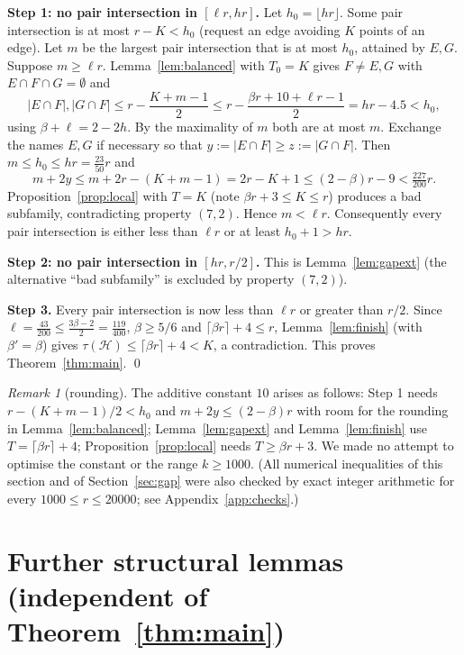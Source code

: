 \documentclass[11pt]{amsart}
\theoremstyle{definition}
\theoremstyle{remark}
\newtheorem{remark}[theorem]{Remark}
\newcommand{\cH}{\mathcal H}
\newcommand{\ceil}[1]{\lceil #1\rceil}
\newcommand{\floor}[1]{\lfloor #1\rfloor}
\begin{document}
\medskip\noindent\textbf{Step 1: no pair intersection in $[\ell r,hr]$.} Let $h_0=\floor{hr}$. Some pair intersection is at most $r-K<h_0$ (request an edge avoiding $K$ points of an edge). Let $m$ be the largest pair intersection that is at most $h_0$, attained by $E,G$. Suppose $m\ge\ell r$. Lemma~\ref{lem:balanced} with $T_0=K$ gives $F\ne E,G$ with $E\cap F\cap G=\emptyset$ and
\[
|E\cap F|,|G\cap F|\le r-\frac{K+m-1}{2}\le r-\frac{\beta r+10+\ell r-1}{2}=hr-4.5<h_0,
\]
using $\beta+\ell=2-2h$. By the maximality of $m$ both are at most $m$. Exchange the names $E,G$ if necessary so that $y:=|E\cap F|\ge z:=|G\cap F|$. Then $m\le h_0\le hr=\tfrac{23}{50}r$ and
\[
m+2y\le m+2r-(K+m-1)=2r-K+1\le(2-\beta)r-9<\tfrac{227}{200}r .
\]
Proposition~\ref{prop:local} with $T=K$ (note $\beta r+3\le K\le r$) produces a bad subfamily, contradicting property $(7,2)$. Hence $m<\ell r$. Consequently every pair intersection is either less than $\ell r$ or at least $h_0+1>hr$.

\medskip\noindent\textbf{Step 2: no pair intersection in $[hr,r/2]$.} This is Lemma~\ref{lem:gapext} (the alternative ``bad subfamily'' is excluded by property $(7,2)$).

\medskip\noindent\textbf{Step 3.} Every pair intersection is now less than $\ell r$ or greater than $r/2$. Since $\ell=\tfrac{43}{200}\le\tfrac{3\beta-2}{2}=\tfrac{119}{400}$, $\beta\ge5/6$ and $\ceil{\beta r}+4\le r$, Lemma~\ref{lem:finish} (with $\beta'=\beta$) gives $\tau(\cH)\le\ceil{\beta r}+4<K$, a contradiction. This proves Theorem~\ref{thm:main}. \qed

\begin{remark}[rounding]
The additive constant $10$ arises as follows: Step 1 needs $r-(K+m-1)/2<h_0$ and $m+2y\le(2-\beta)r$ with room for the rounding in Lemma~\ref{lem:balanced}; Lemma~\ref{lem:gapext} and Lemma~\ref{lem:finish} use $T=\ceil{\beta r}+4$; Proposition~\ref{prop:local} needs $T\ge\beta r+3$. We made no attempt to optimise the constant or the range $k\ge1000$. (All numerical inequalities of this section and of Section~\ref{sec:gap} were also checked by exact integer arithmetic for every $1000\le r\le 20000$; see Appendix~\ref{app:checks}.)
\end{remark}

\section{Further structural lemmas (independent of Theorem~\ref{thm:main})}\label{sec:further}
\end{document}
